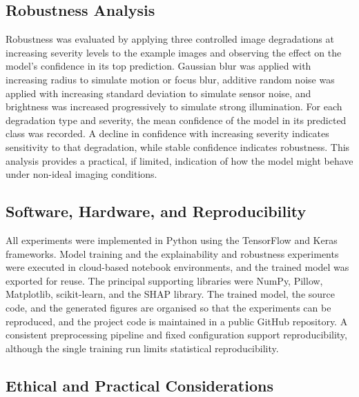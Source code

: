 \documentclass[preprint,12pt]{elsarticle}
\begin{document}
\subsection{Robustness Analysis}

Robustness was evaluated by applying three controlled image degradations at increasing severity levels to the example images and observing the effect on the model's confidence in its top prediction.
Gaussian blur was applied with increasing radius to simulate motion or focus blur, additive random noise was applied with increasing standard deviation to simulate sensor noise, and brightness was increased progressively to simulate strong illumination.
For each degradation type and severity, the mean confidence of the model in its predicted class was recorded.
A decline in confidence with increasing severity indicates sensitivity to that degradation, while stable confidence indicates robustness.
This analysis provides a practical, if limited, indication of how the model might behave under non-ideal imaging conditions.

\subsection{Software, Hardware, and Reproducibility}

All experiments were implemented in Python using the TensorFlow and Keras frameworks.
Model training and the explainability and robustness experiments were executed in cloud-based notebook environments, and the trained model was exported for reuse.
The principal supporting libraries were NumPy, Pillow, Matplotlib, scikit-learn, and the SHAP library.
The trained model, the source code, and the generated figures are organised so that the experiments can be reproduced, and the project code is maintained in a public GitHub repository.
A consistent preprocessing pipeline and fixed configuration support reproducibility, although the single training run limits statistical reproducibility.

\subsection{Ethical and Practical Considerations}
\end{document}
